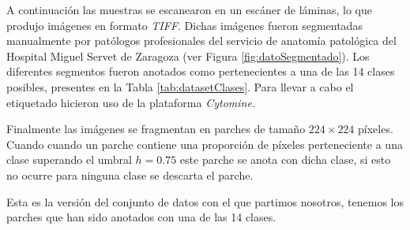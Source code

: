 A continuación las muestras se escanearon en un escáner de láminas, lo que produjo imágenes en formato \textit{TIFF}. Dichas imágenes fueron segmentadas manualmente por patólogos profesionales del servicio de anatomía patológica del Hospital Miguel Servet de Zaragoza (ver Figura \ref{fig:datoSegmentado}). Los diferentes segmentos fueron anotados como pertenecientes a una de las 14 clases posibles, presentes en la Tabla \ref{tab:datasetClases}. Para llevar a cabo el etiquetado hicieron uso de la plataforma \textit{Cytomine}. 


Finalmente las imágenes se fragmentan en parches de tamaño $224\times 224$ píxeles. Cuando cuando un parche contiene una proporción de píxeles perteneciente a una clase superando el umbral $h = 0.75$ este parche se anota con dicha clase, si esto no ocurre para ninguna clase se descarta el parche. 

Esta es la versión del conjunto de datos con el que partimos nosotros, tenemos los parches que han sido anotados con una de las 14 clases.

